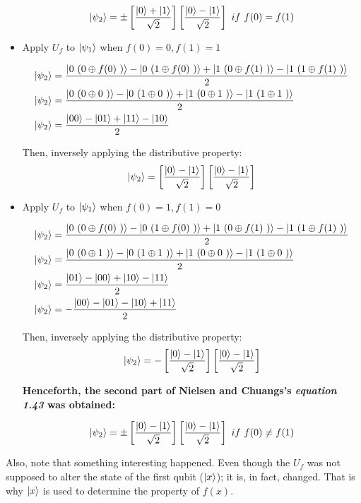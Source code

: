 \begin{itemize}
    \[
    \ket{\psi_2} = \pm \left[ \frac{\ket{0} + \ket{1}}{\sqrt{2}} \right]
        \left[ \frac{\ket{0} - \ket{1}}{\sqrt{2}} \right]\ if \ f(0) = f(1)
    \]
    
    \item Apply \(U_f\) to \(\ket{\psi_1}\) when \(f(0) = 0, f(1) = 1\)
    
        \begin{align}
        \ket{\psi_2} &= \frac{\ket{0\ (0 \oplus f(0)\ )} - \ket{0\ (1 \oplus f(0)\ )} +
        \ket{1\ (0 \oplus f(1)\ )} - \ket{1\ (1 \oplus f(1)\ )}}{2}
        \\
        \ket{\psi_2} &=  \frac{\ket{0\ (0 \oplus 0\ )} - \ket{0\ (1 \oplus 0\ )} +
        \ket{1\ (0 \oplus 1\ )} - \ket{1\ (1 \oplus 1\ )}}{2}
        \\
        \ket{\psi_2} &= \frac{\ket{00} - \ket{01} + \ket{11} - \ket{10}}{2}
    \end{align}
    
    Then, inversely applying the distributive property:
    \begin{equation}
        \ket{\psi_2} =
        \left[ \frac{\ket{0} - \ket{1}}{\sqrt{2}} \right]
        \left[ \frac{\ket{0} - \ket{1}}{\sqrt{2}} \right]
    \end{equation}
    
    \item Apply \(U_f\) to \(\ket{\psi_1}\) when \(f(0) = 1, f(1) = 0\)
    
        \begin{align}
        \ket{\psi_2} &= \frac{\ket{0\ (0 \oplus f(0)\ )} - \ket{0\ (1 \oplus f(0)\ )} +
        \ket{1\ (0 \oplus f(1)\ )} - \ket{1\ (1 \oplus f(1)\ )}}{2}
        \\
        \ket{\psi_2} &=  \frac{\ket{0\ (0 \oplus 1\ )} - \ket{0\ (1 \oplus 1\ )} +
        \ket{1\ (0 \oplus 0\ )} - \ket{1\ (1 \oplus 0\ )}}{2}
        \\
        \ket{\psi_2} &= \frac{\ket{01} - \ket{00} + \ket{10} - \ket{11}}{2}
        \\
        \ket{\psi_2} &= - \frac{\ket{00} - \ket{01} - \ket{10} + \ket{11}}{2}
    \end{align}
    
    Then, inversely applying the distributive property:
    \begin{equation}
        \ket{\psi_2} = -
        \left[ \frac{\ket{0} - \ket{1}}{\sqrt{2}} \right]
        \left[ \frac{\ket{0} - \ket{1}}{\sqrt{2}} \right]
    \end{equation}
    
    \textbf{Henceforth, the second part of Nielsen and Chuangs's \emph{equation 1.43} was obtained:}
    
    \[
    \ket{\psi_2} = \pm \left[ \frac{\ket{0} - \ket{1}}{\sqrt{2}} \right]
        \left[ \frac{\ket{0} - \ket{1}}{\sqrt{2}} \right]\ if \ f(0) \neq f(1)
    \]
\end{itemize}

Also, note that something interesting happened. Even though the \(U_f\) was not supposed to alter the state of the first qubit (\(\ket{x}\)); it is, in fact, changed. That is why \(\ket{x}\) is used to determine the property of \(f(x)\).